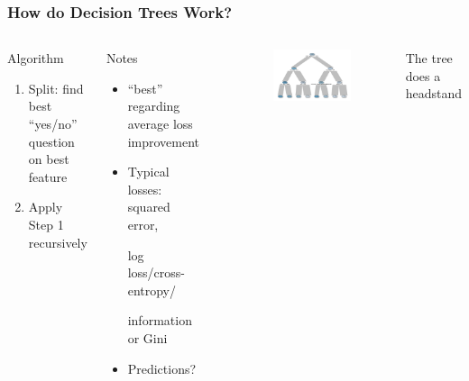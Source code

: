 \documentclass[
    utf8,
    aspectratio=169
]{beamer}  %
\begin{document}
\begin{frame}
\frametitle{How do Decision Trees Work?}
\begin{columns}[onlytextwidth]
	\begin{block}{Algorithm}
		\begin{enumerate}
			\item Split: find best ``yes/no'' question on best feature		
			\item Apply Step 1 recursively
		\end{enumerate}
	\end{block}

	\begin{exampleblock}{Notes}
		\begin{itemize}
			\item ``best'' regarding average loss improvement
			\item Typical losses: squared error, 
			
			log loss/cross-entropy/ 
			
			information or Gini
			\item Predictions?
		\end{itemize}
	\end{exampleblock}

	\begin{example}
	\end{example}

	\begin{figure}
		\includegraphics[width=1\textwidth]{pics/tree.pdf}
	\end{figure}
	The tree does a headstand
\end{columns}
\end{frame}
\end{document}
